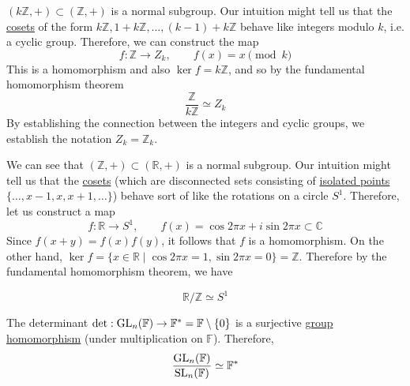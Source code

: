   \begin{example}
    \label{ex:cyclic-groups-2}
    $(k \mathbb{Z}, +) \subset (\mathbb{Z}, +)$ is a normal subgroup. Our intuition might tell us that the \hyperref[def:coset]{cosets} of the form $k \mathbb{Z}, 1 + k \mathbb{Z}, \ldots, (k-1) + k\mathbb{Z}$ behave like integers modulo $k$, i.e. a cyclic group. Therefore, we can construct the map 
    \begin{equation}
      f: \mathbb{Z} \to Z_k, \qquad f(x) = x \pmod{k}
    \end{equation} 
    This is a homomorphism and also $\ker{f} = k \mathbb{Z}$, and so by the fundamental homomorphism theorem 
    \begin{equation}
      \frac{\mathbb{Z}}{k \mathbb{Z}} \simeq Z_k 
    \end{equation}
    By establishing the connection between the integers and cyclic groups, we establish the notation $Z_k = \mathbb{Z}_k$. 
  \end{example}

  \begin{example}
    \label{ex:quotient-of-reals-over-integers}
    We can see that $(\mathbb{Z}, +) \subset (\mathbb{R}, +)$ is a normal subgroup. Our intuition might tell us that the \hyperref[def:coset]{cosets} (which are disconnected sets consisting of \hyperref[pst-def:isolated-point]{isolated points} $\{\ldots, x - 1, x, x + 1, \ldots\}$) behave sort of like the rotations on a circle $S^1$. Therefore, let us construct a map 
    \begin{equation}
      f: \mathbb{R} \to S^1, \qquad f(x) = \cos{2\pi x} + i \sin{2\pi x} \subset \mathbb{C}
    \end{equation}
    Since $f(x + y) = f(x) f(y)$, it follows that $f$ is a homomorphism. On the other hand, $\ker{f} = \{ x \in \mathbb{R} \mid \cos{2 \pi x} = 1, \sin{2 \pi x} = 0 \} = \mathbb{Z}$. Therefore by the fundamental homomorphism theorem, we have
     
    \begin{equation}
      \mathbb{R}/\mathbb{Z} \simeq S^1
    \end{equation}
  \end{example}

  \begin{example}[Determinant]
    \label{ex:determinant-2}
    The determinant $\det: \operatorname{GL}_n (\mathbb{F}) \to \mathbb{F}^\ast = \mathbb{F} \setminus \{0\}$ is a surjective \hyperref[def:group-homomorphism]{group homomorphism} (under multiplication on $\mathbb{F}$). Therefore, 
    \begin{equation}
      \frac{\operatorname{GL}_n (\mathbb{F})}{\operatorname{SL}_n (\mathbb{F})} \simeq \mathbb{F}^\ast
    \end{equation}
  \end{example}

